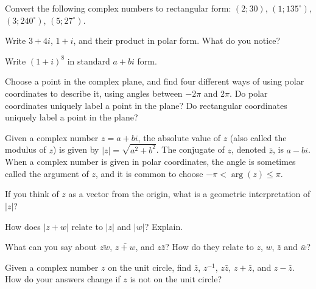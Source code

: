 \documentclass[space,nooutcomes]{ximera}
\begin{document}
\begin{problem}
Convert the following complex numbers to rectangular form: $(2; 30)$, $(1; 135^\circ)$, 
$(3; 240^\circ)$, $(5; 27^\circ)$.  
\vfill 
\end{problem}

\newpage 

\begin{problem}
Write $3 + 4i$, $1 + i$, and their product in polar form.  What do you notice?  
\vfill 
\end{problem}

\begin{problem}
Write $(1 + i)^8$ in standard $a + bi$ form.  
\vfill 
\end{problem}

\begin{problem}
Choose a point in the complex plane, and find four different ways of using polar coordinates to describe it, using angles between $-2\pi$ and $2\pi$.  
Do polar coordinates uniquely label a point in the plane?
Do rectangular coordinates uniquely label a point in the plane?
\vfill 
\end{problem}

\newpage 


Given a complex number $z=a+bi$, the absolute value of $z$ (also called the modulus of $z$) is given by $|z|=\sqrt{a^2+b^2}$.  The conjugate of $z$, denoted $\bar{z}$, is $a-bi$.  When a complex number is given in polar coordinates, the angle is sometimes called the argument of $z$, and it is common to choose $-\pi<\arg(z)\le \pi$.  

\begin{problem}
If you think of $z$ as a vector from the origin, what is a geometric interpretation of $|z|$?  
\vfill 
\end{problem}

\begin{problem}
How does $|z+w|$ relate to $|z|$ and $|w|$?  Explain.  
\vfill 
\end{problem}

\begin{problem}
What can you say about $\bar{zw}$, $\bar{z+w}$, and $z\bar{z}$?  How do they relate to $z$, $w$, $\bar{z}$ and $\bar{w}$?
\vfill 
\end{problem}

\begin{problem}
Given a complex number $z$ on the unit circle, find $\bar{z}$, $z^{-1}$, $z\bar{z}$, $z+\bar{z}$, and $z-\bar{z}$.  How do your answers change if $z$ is not on the unit circle?
\vfill 
\end{problem}
\end{document}
